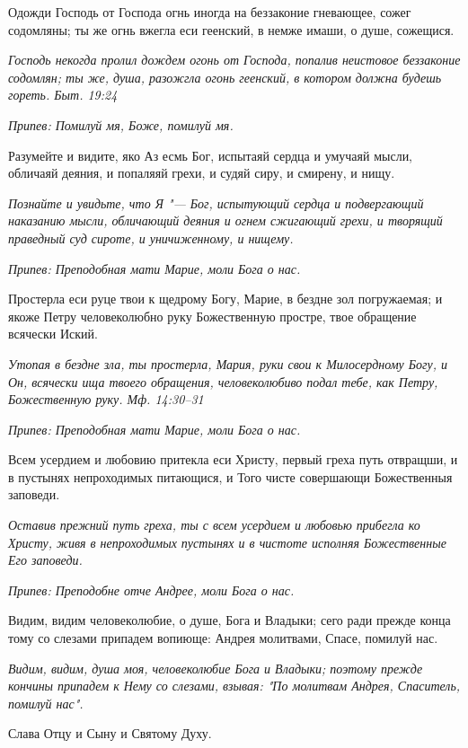 Одожди Господь от Господа огнь иногда на беззаконие гневающее, сожег содомляны; ты же огнь вжегла еси геенский, в немже имаши, о душе, сожещися.


\itshape Господь некогда пролил дождем огонь от Господа, попалив неистовое беззаконие содомлян; ты же, душа, разожгла огонь геенский, в котором должна будешь гореть. Быт. 19:24\normalfont{}


\itshape Припев:\normalfont{} Помилуй мя, Боже, помилуй мя.


Разумейте и видите, яко Аз есмь Бог, испытаяй сердца и умучаяй мысли, обличаяй деяния, и попаляяй грехи, и судяй сиру, и смирену, и нищу.


\itshape Познайте и увидьте, что Я "--- Бог, испытующий сердца и подвергающий наказанию мысли, обличающий деяния и огнем сжигающий грехи, и творящий праведный суд сироте, и уничиженному, и нищему.\normalfont{}


\itshape Припев:\normalfont{} Преподобная мати Марие, моли Бога о нас.


Простерла еси руце твои к щедрому Богу, Марие, в бездне зол погружаемая; и якоже Петру человеколюбно руку Божественную простре, твое обращение всячески Иский.


\itshape Утопая в бездне зла, ты простерла, Мария, руки свои к Милосердному Богу, и Он, всячески ища твоего обращения, человеколюбиво подал тебе, как Петру, Божественную руку. Мф. 14:30–31\normalfont{}


\itshape Припев:\normalfont{} Преподобная мати Марие, моли Бога о нас.


Всем усердием и любовию притекла еси Христу, первый греха путь отвращши, и в пустынях непроходимых питающися, и Того чисте совершающи Божественныя заповеди.


\itshape Оставив прежний путь греха, ты с всем усердием и любовью прибегла ко Христу, живя в непроходимых пустынях и в чистоте исполняя Божественные Его заповеди.\normalfont{}


\itshape Припев:\normalfont{} Преподобне отче Андрее, моли Бога о нас.


Видим, видим человеколюбие, о душе, Бога и Владыки; сего ради прежде конца тому со слезами припадем вопиюще: Андрея молитвами, Спасе, помилуй нас.


\itshape Видим, видим, душа моя, человеколюбие Бога и Владыки; поэтому прежде кончины припадем к Нему со слезами, взывая: "По молитвам Андрея, Спаситель, помилуй нас".\normalfont{}


Слава Отцу и Сыну и Святому Духу.


